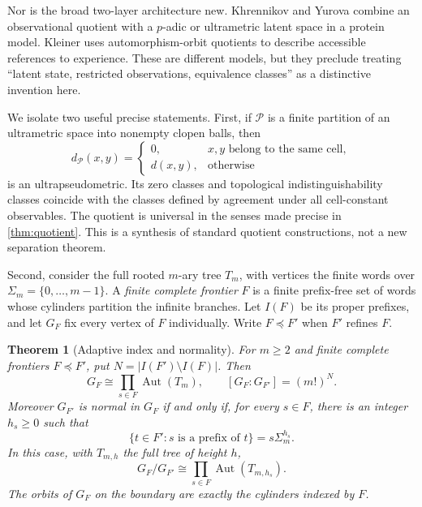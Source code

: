 \documentclass[11pt]{article}
\newtheorem{theorem}{Theorem}[section]
\theoremstyle{definition}
\theoremstyle{remark}
\newcommand{\Aut}{\operatorname{Aut}}
\newcommand{\PP}{\mathcal P}
\begin{document}
Nor is the broad two-layer architecture new. Khrennikov and Yurova \cite[Sections 4 and 9]{KhrennikovYurova2017} combine an observational quotient with a $p$-adic or ultrametric latent space in a protein model. Kleiner \cite[Sections 3.3--3.4]{Kleiner2020} uses automorphism-orbit quotients to describe accessible references to experience. These are different models, but they preclude treating ``latent state, restricted observations, equivalence classes'' as a distinctive invention here.

We isolate two useful precise statements. First, if $\PP$ is a finite partition of an ultrametric space into nonempty clopen balls, then
\begin{equation}\label{eq:collapse}
 d_{\PP}(x,y)=
 \begin{cases}0,&x,y\text{ belong to the same cell},\\d(x,y),&\text{otherwise}\end{cases}
\end{equation}
is an ultrapseudometric. Its zero classes and topological indistinguishability classes coincide with the classes defined by agreement under all cell-constant observables. The quotient is universal in the senses made precise in \cref{thm:quotient}. This is a synthesis of standard quotient constructions, not a new separation theorem.

Second, consider the full rooted $m$-ary tree $T_m$, with vertices the finite words over $\Sigma_m=\{0,\ldots,m-1\}$. A \emph{finite complete frontier} $F$ is a finite prefix-free set of words whose cylinders partition the infinite branches. Let $I(F)$ be its proper prefixes, and let $G_F$ fix every vertex of $F$ individually. Write $F\preceq F'$ when $F'$ refines $F$.

\begin{theorem}[Adaptive index and normality]\label{thm:adaptive}
For $m\geq2$ and finite complete frontiers $F\preceq F'$, put
$N=|I(F')\setminus I(F)|$. Then
\begin{equation}\label{eq:index}
 G_F\cong\prod_{s\in F}\Aut(T_m),\qquad
 [G_F:G_{F'}]=(m!)^N.
\end{equation}
Moreover $G_{F'}$ is normal in $G_F$ if and only if, for every $s\in F$, there is an integer $h_s\geq0$ such that
\begin{equation}\label{eq:normalcriterion}
 \{t\in F':s\text{ is a prefix of }t\}=s\Sigma_m^{h_s}.
\end{equation}
In this case, with $T_{m,h}$ the full tree of height $h$,
\begin{equation}\label{eq:normalquotient}
 G_F/G_{F'}\cong\prod_{s\in F}\Aut(T_{m,h_s}).
\end{equation}
The orbits of $G_F$ on the boundary are exactly the cylinders indexed by $F$.
\end{theorem}
\end{document}
